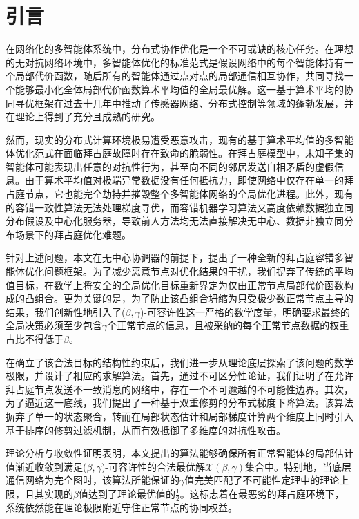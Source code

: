 \section{引言}

\quad \quad  在网络化的多智能体系统中，分布式协作优化是一个不可或缺的核心任务。在理想的无对抗网络环境中，多智能体优化的标准范式是假设网络中的每个智能体持有一个局部代价函数，随后所有的智能体通过点对点的局部通信相互协作，共同寻找一个能够最小化全体局部代价函数算术平均值的全局最优解\cite{nedic2009distributed}。这一基于算术平均的协同寻优框架在过去十几年中推动了传感器网络、分布式控制等领域的蓬勃发展，并在理论上得到了充分且成熟的研究。

然而，现实的分布式计算环境极易遭受恶意攻击，现有的基于算术平均值的多智能体优化范式在面临拜占庭故障时存在致命的脆弱性。在拜占庭模型中\cite{lynch1996distributed}，未知子集的智能体可能表现出任意的对抗性行为，甚至向不同的邻居发送自相矛盾的虚假信息。由于算术平均值对极端异常数据没有任何抵抗力，即使网络中仅存在单一的拜占庭节点，它也能完全劫持并摧毁整个多智能体网络的全局优化进程\cite{sundaram2019distributed}。此外，现有的容错一致性算法无法处理梯度寻优\cite{vaidya2012iterative}，而容错机器学习算法又高度依赖数据独立同分布假设及中心化服务器\cite{yin2018byzantine}，导致前人方法均无法直接解决无中心、数据非独立同分布场景下的拜占庭优化难题。

针对上述问题，本文在无中心协调器的前提下，提出了一种全新的拜占庭容错多智能体优化问题框架。为了减少恶意节点对优化结果的干扰，我们摒弃了传统的平均值目标，在数学上将安全的全局优化目标重新界定为仅由正常节点局部代价函数构成的凸组合。更为关键的是，为了防止该凸组合坍缩为只受极少数正常节点主导的结果，我们创新性地引入了($\beta, \gamma$)-可容许性这一严格的数学度量，明确要求最终的全局决策必须至少包含$\gamma$个正常节点的信息，且被采纳的每个正常节点数据的权重占比不得低于$\beta$。

在确立了该合法目标的结构性约束后，我们进一步从理论底层探索了该问题的数学极限，并设计了相应的求解算法。首先，通过不可区分性论证，我们证明了在允许拜占庭节点发送不一致消息的网络中，存在一个不可逾越的不可能性边界。其次，为了逼近这一底线，我们提出了一种基于双重修剪的分布式梯度下降算法。该算法摒弃了单一的状态聚合，转而在局部状态估计和局部梯度计算两个维度上同时引入基于排序的修剪过滤机制，从而有效抵御了多维度的对抗性攻击。

理论分析与收敛性证明表明，本文提出的算法能够确保所有正常智能体的局部估计值渐近收敛到满足($\beta, \gamma$)-可容许性的合法最优解$\mathcal{X}(\beta, \gamma)$集合中。特别地，当底层通信网络为完全图时，该算法所能保证的$\gamma$值完美匹配了不可能性定理中的理论上限，且其实现的$\beta$值达到了理论最优值的$\frac{1}{2}$。这标志着在最恶劣的拜占庭环境下，系统依然能在理论极限附近守住正常节点的协同权益。

